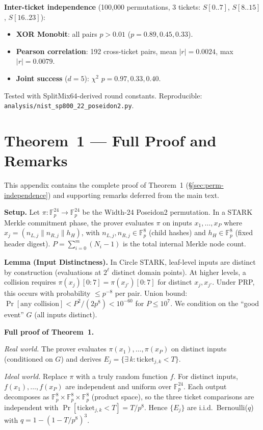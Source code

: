 \documentclass[11pt,a4paper]{article}
\begin{document}
\textbf{Inter-ticket independence} (100,000 permutations, 3 tickets: $S[0..7]$, $S[8..15]$, $S[16..23]$):
\begin{itemize}
\item \textbf{XOR Monobit}: all pairs $p > 0.01$ ($p = 0.89, 0.45, 0.33$).
\item \textbf{Pearson correlation}: 192 cross-ticket pairs, mean $|r| = 0.0024$, max $|r| = 0.0079$.
\item \textbf{Joint success} ($d = 5$): $\chi^2$ $p = 0.97, 0.33, 0.40$.
\end{itemize}

Tested with SplitMix64-derived round constants. Reproducible: \texttt{analysis/nist\_sp800\_22\_poseidon2.py}.

\section{Theorem~1 --- Full Proof and Remarks}
\label{app:proof}
\label{app:fullproof}

This appendix contains the complete proof of Theorem~1 (\S\ref{sec:perm-independence}) and supporting remarks deferred from the main text.

\textbf{Setup.} Let $\pi: \mathbb{F}_p^{24} \to \mathbb{F}_p^{24}$ be the Width-24 Poseidon2 permutation. In a STARK Merkle commitment phase, the prover evaluates $\pi$ on inputs $x_1, \ldots, x_P$ where $x_j = (n_{L,j} \| n_{R,j} \| h_H)$, with $n_{L,j}, n_{R,j} \in \mathbb{F}_p^8$ (child hashes) and $h_H \in \mathbb{F}_p^8$ (fixed header digest). $P = \sum_{i=0}^{m}(N_i - 1)$ is the total internal Merkle node count.

\textbf{Lemma (Input Distinctness).} In Circle STARK, leaf-level inputs are distinct by construction (evaluations at $2^\ell$ distinct domain points). At higher levels, a collision requires $\pi(x_j)[0{:}7] = \pi(x_{j'})[0{:}7]$ for distinct $x_j, x_{j'}$. Under PRP, this occurs with probability $\leq p^{-8}$ per pair. Union bound: $\Pr[\text{any collision}] < P^2/(2p^8) < 10^{-60}$ for $P \leq 10^7$. We condition on the ``good event'' $G$ (all inputs distinct).

\textbf{Full proof of Theorem~1.}

\emph{Real world.} The prover evaluates $\pi(x_1), \ldots, \pi(x_P)$ on distinct inputs (conditioned on $G$) and derives $E_j = \{\exists\, k : \text{ticket}_{j,k} < T\}$.

\emph{Ideal world.} Replace $\pi$ with a truly random function $f$. For distinct inputs, $f(x_1), \ldots, f(x_P)$ are independent and uniform over $\mathbb{F}_p^{24}$. Each output decomposes as $\mathbb{F}_p^8 \times \mathbb{F}_p^8 \times \mathbb{F}_p^8$ (product space), so the three ticket comparisons are independent with $\Pr[\text{ticket}_{j,k} < T] = T/p^8$. Hence $\{E_j\}$ are i.i.d.\ Bernoulli($q$) with $q = 1-(1-T/p^8)^3$.
\end{document}
